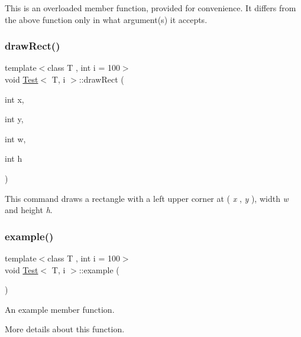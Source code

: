 This is an overloaded member function, provided for convenience. It differs from the above function only in what argument(s) it accepts.\mbox{\label{class_test_a6b16f6be500388342845646c1969d3aa}} 
\subsubsection{\texorpdfstring{drawRect()}{drawRect()}\hspace{0.1cm}{\footnotesize\ttfamily [3/3]}}
{\footnotesize\ttfamily template$<$class T , int i = 100$>$ \\
void \mbox{\hyperlink{class_test}{Test}}$<$ T, i $>$\+::draw\+Rect (\begin{DoxyParamCaption}\item[{int}]{x,  }\item[{int}]{y,  }\item[{int}]{w,  }\item[{int}]{h }\end{DoxyParamCaption})}

This command draws a rectangle with a left upper corner at ( {\itshape x} , {\itshape y} ), width {\itshape w} and height {\itshape h}. \mbox{\label{class_test_a219565a812ad07b6517d74bdb36711ea}} 
\subsubsection{\texorpdfstring{example()}{example()}\hspace{0.1cm}{\footnotesize\ttfamily [1/2]}}
{\footnotesize\ttfamily template$<$class T , int i = 100$>$ \\
void \mbox{\hyperlink{class_test}{Test}}$<$ T, i $>$\+::example (\begin{DoxyParamCaption}{ }\end{DoxyParamCaption})}



An example member function. 

More details about this function. \mbox{\label{class_test_a741b152810e5bab756cc06c9ded78f5f}} 
